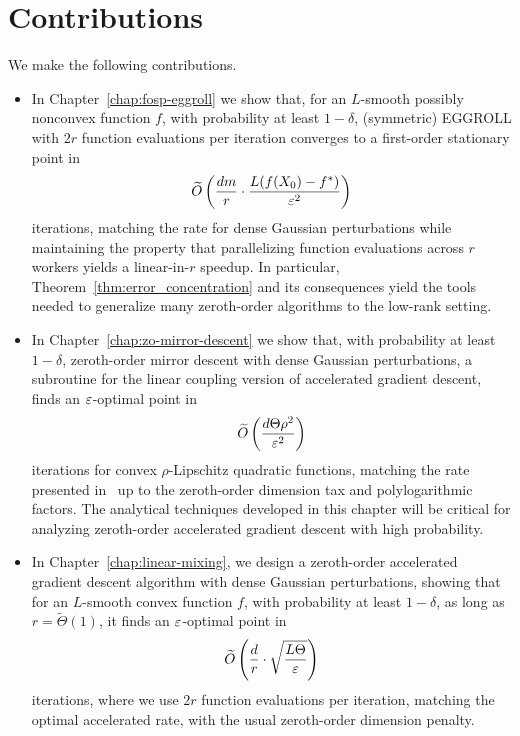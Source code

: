 \section{Contributions}
We make the following contributions.
\begin{itemize}
    \item In Chapter~\ref{chap:fosp-eggroll} we show that, for an $L$-smooth possibly nonconvex function $f$, with probability at least $1-\delta$, (symmetric) EGGROLL with $2r$ function evaluations per iteration converges to a first-order stationary point in 
    \begin{align*}
        \widetilde{O}\left(\frac{dm}{r} \cdot \frac{L(f(X_0) - f^*)}{\varepsilon^2}\right)
    \end{align*}
    iterations, matching the rate for dense Gaussian perturbations while maintaining the property that parallelizing function evaluations across $r$ workers yields a linear-in-$r$ speedup. In particular, Theorem~\ref{thm:error_concentration} and its consequences yield the tools needed to generalize many zeroth-order algorithms to the low-rank setting.

    \item In Chapter~\ref{chap:zo-mirror-descent} we show that, with probability at least $1-\delta$, zeroth-order mirror descent with dense Gaussian perturbations, a subroutine for the linear coupling version of accelerated gradient descent, finds an $\varepsilon$-optimal point in 
    \begin{align*}
        \widetilde{O}\left(\frac{d \Theta \rho^2}{\varepsilon^2} \right)
    \end{align*} iterations for convex $\rho$-Lipschitz quadratic functions, matching the rate presented in~\citet{allenZhu2016linear} up to the zeroth-order dimension tax and polylogarithmic factors. The analytical techniques developed in this chapter will be critical for analyzing zeroth-order accelerated gradient descent with high probability.

    \item In Chapter~\ref{chap:linear-mixing}, we design a zeroth-order accelerated gradient descent algorithm with dense Gaussian perturbations, showing that for an $L$-smooth convex function $f$, with probability at least $1-\delta$, as long as $r = \widetilde{\Theta}(1)$, it finds an $\varepsilon$-optimal point in
    \begin{align*}
        \widetilde{O}\left(\frac{d}{r} \cdot \sqrt{\frac{L\Theta}{\varepsilon}}\right)
    \end{align*}
    iterations, where we use $2r$ function evaluations per iteration, matching the optimal accelerated rate, with the usual zeroth-order dimension penalty. 
\end{itemize}
